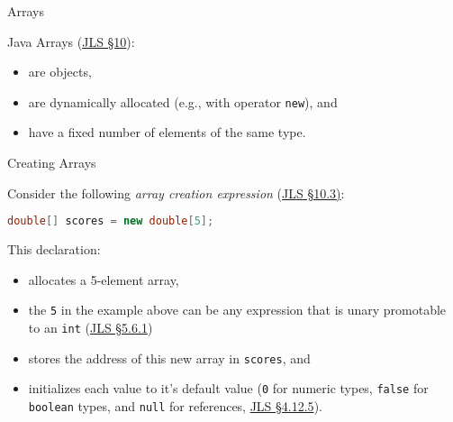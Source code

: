 \documentclass{beamer}
\author[Chris Simpkins] 
{Christopher Simpkins \\\texttt{chris.simpkins@gatech.edu}}
\institute[Georgia Tech] %
\date[CS 1331]{}
\begin{document}
\begin{frame}
  \titlepage
\end{frame}


\begin{frame}[fragile]{Arrays}


Java Arrays (\href{http://docs.oracle.com/javase/specs/jls/se7/html/jls-10.html}{JLS \S 10}):
\begin{itemize}
\item are objects,
\item are dynamically allocated (e.g., with operator {\tt new}), and
\item have a fixed number of elements of the same type.
\end{itemize}



\end{frame}

\begin{frame}[fragile]{Creating Arrays}


Consider the following {\it array creation expression} (\href{http://docs.oracle.com/javase/specs/jls/se7/html/jls-10.html#jls-10.3}{JLS \S 10.3)}:
\begin{lstlisting}[language=Java]
double[] scores = new double[5];
\end{lstlisting}
This declaration:
\begin{itemize}
\item allocates a 5-element array,
\item the {\tt 5} in the example above can be any expression that is unary promotable to an {\tt int} (\href{http://docs.oracle.com/javase/specs/jls/se7/html/jls-5.html#jls-5.6.1}{JLS \S 5.6.1})
\item stores the address of this new array in {\tt scores}, and
\item initializes each value to it's default value ({\tt 0} for numeric types, {\tt false} for {\tt boolean} types, and {\tt null} for references, \href{http://docs.oracle.com/javase/specs/jls/se7/html/jls-4.html#jls-4.12.5}{JLS \S 4.12.5}).
\end{itemize}


\end{frame}
\end{document}
